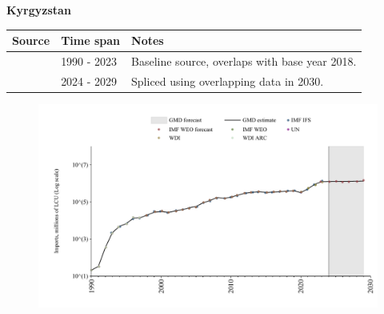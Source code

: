 \documentclass[12pt,a4paper,landscape]{article}
\begin{document}
\begin{adjustbox}{max totalsize={\paperwidth}{\paperheight},center}
\begin{minipage}[t][\textheight][t]{\textwidth}
\vspace*{0.5cm}
{}
\begin{center}
{\Large\bfseries Kyrgyzstan}
\end{center}
\vspace{0.5cm}
\begin{table}[H]
\centering
\small
\begin{tabular}{|l|l|l|}
\hline
\textbf{Source} & \textbf{Time span} & \textbf{Notes} \\
\hline
\rowcolor{white}\cite{WDI}& 1990 - 2023 &Baseline source, overlaps with base year 2018.\\
\rowcolor{lightgray}\cite{IMF_WEO_forecast}& 2024 - 2029 &Spliced using overlapping data in 2030.\\
\hline
\end{tabular}
\end{table}
\begin{figure}[H]
\centering
\includegraphics[width=\textwidth,height=0.6\textheight,keepaspectratio]{graphs/KGZ_imports.pdf}
\end{figure}
\end{minipage}
\end{adjustbox}
\end{document}

